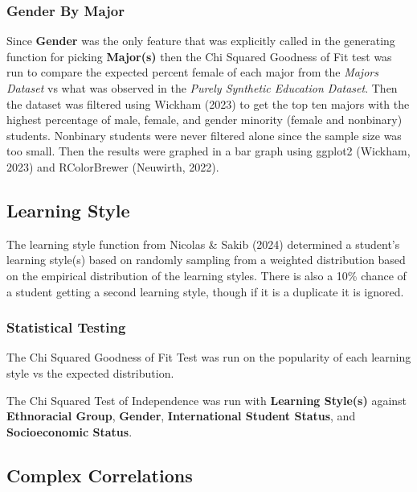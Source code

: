 \documentclass{article}
\begin{document}
\subsubsection{Gender By Major}\label{gender-by-major}

Since \textbf{Gender} was the only feature that was explicitly called in the generating function for picking \textbf{Major(s)} then the Chi Squared Goodness of Fit test was run to compare the expected percent female of each major from the \emph{Majors Dataset} vs what was observed in the \emph{Purely Synthetic Education Dataset}. Then the dataset was filtered using Wickham (2023) to get the top ten majors with the highest percentage of male, female, and gender minority (female and nonbinary) students. Nonbinary students were never filtered alone since the sample size was too small. Then the results were graphed in a bar graph using ggplot2 (Wickham, 2023) and RColorBrewer (Neuwirth, 2022).

\subsection{Learning Style}\label{learning-style}

\label{sec:learning_style}

The learning style function from Nicolas \& Sakib (2024) determined a student's learning style(s) based on randomly sampling from a weighted distribution based on the empirical distribution of the learning styles. There is also a 10\% chance of a student getting a second learning style, though if it is a duplicate it is ignored.

\subsubsection{Statistical Testing}\label{statistical-testing-2}

The Chi Squared Goodness of Fit Test was run on the popularity of each learning style vs the expected distribution.

The Chi Squared Test of Independence was run with \textbf{Learning Style(s)} against \textbf{Ethnoracial Group}, \textbf{Gender}, \textbf{International Student Status}, and \textbf{Socioeconomic Status}.

\subsection{Complex Correlations}\label{complex-correlations}
\end{document}
